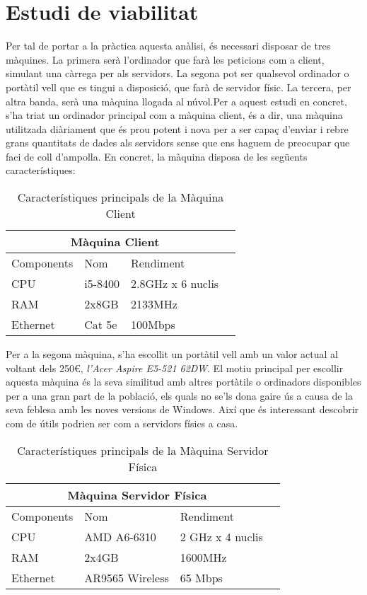 \chapter{Estudi de viabilitat}

Per tal de portar a la pràctica aquesta anàlisi, és necessari disposar de tres màquines. La primera serà l'ordinador que farà les peticions com a client, simulant una càrrega per als servidors. La segona pot ser qualsevol ordinador o portàtil vell que es tingui a disposició, que farà de servidor físic. La tercera, per altra banda, serà una màquina llogada al núvol.Per a aquest estudi en concret, s'ha triat un ordinador principal com a màquina client, és a dir, una màquina utilitzada diàriament que és prou potent i nova per a ser capaç d'enviar i rebre grans quantitats de dades als servidors sense que ens haguem de preocupar que faci de coll d'ampolla. En concret, la màquina disposa de les següents característiques:

\begin{table}[ht]
\centering
\begin{tabular}{ |p{3cm}||p{3cm}|p{3cm}|p{3cm}|  }
 \hline
 \multicolumn{3}{|c|}{Màquina Client} \\
 \hline
 Components & Nom & Rendiment \\
 \hline
 CPU  & i5-8400 & 2.8GHz x 6 nuclis\\
 RAM & 2x8GB  & 2133MHz   \\
 Ethernet & Cat 5e & 100Mbps\\
 \hline
\end{tabular}
\caption{Característiques principals de la Màquina Client}
\label{Tab:MaquinaClient}
\end{table}

Per a la segona màquina, s'ha escollit un portàtil vell amb un valor actual al voltant dels 250€, \textit{l'Acer Aspire E5-521 62DW}. El motiu principal per escollir aquesta màquina és la seva similitud amb altres portàtils o ordinadors disponibles per a una gran part de la població, els quals no se'ls dona gaire ús a causa de la seva feblesa amb les noves versions de Windows. Així que és interessant descobrir com de útils podrien ser com a servidors físics a casa.

\begin{table}[ht]
\centering
\begin{tabular}{ |p{3cm}||p{3cm}|p{3cm}|p{3cm}|  }
 \hline
 \multicolumn{3}{|c|}{Màquina Servidor Física} \\
 \hline
 Components & Nom & Rendiment \\
 \hline
 CPU  & AMD A6-6310 &  2 GHz x 4 nuclis\\
 RAM & 2x4GB  &  1600MHz   \\ 
 Ethernet & AR9565 Wireless & 65 Mbps\\ 
 \hline
\end{tabular}
\caption{Característiques principals de la Màquina Servidor Física}
\label{Tab:MaquinaServidorFisic}
\end{table}

